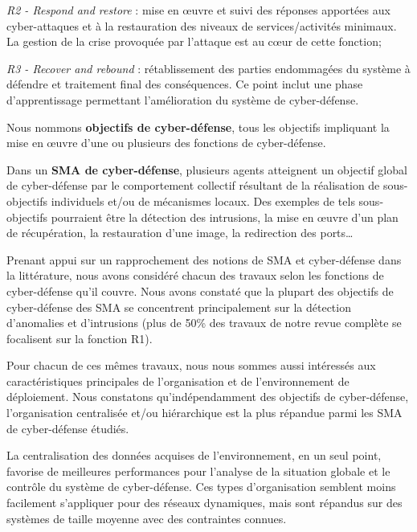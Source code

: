 \documentclass[french]{pfia}
\begin{document}
\textit{R2 - Respond and restore} : mise en œuvre et suivi des réponses apportées aux cyber-attaques et à la restauration des niveaux de services/activités minimaux. La gestion de la crise provoquée par l'attaque est au cœur de cette fonction;

\textit{R3 - Recover and rebound} : rétablissement des parties endommagées du système à défendre et traitement final des conséquences. Ce point inclut une phase d'apprentissage permettant l'amélioration du système de cyber-défense.


Nous nommons \textbf{objectifs de cyber-défense}, tous les objectifs impliquant la mise en œuvre d'une ou plusieurs des fonctions de cyber-défense.

Dans un \textbf{SMA de cyber-défense}, plusieurs agents atteignent un objectif global de cyber-défense par le comportement collectif résultant de la réalisation de sous-objectifs individuels et/ou de mécanismes locaux\cite{jamont2015meeting}. Des exemples de tels sous-objectifs pourraient être la détection des intrusions, la mise en œuvre d'un plan de récupération, la restauration d'une image, la redirection des ports\dots


Prenant appui sur un rapprochement des notions de SMA et cyber-défense dans la littérature, nous avons considéré chacun des travaux selon les fonctions de cyber-défense qu'il couvre.
Nous avons constaté que la plupart des objectifs de cyber-défense des SMA se concentrent principalement sur la détection d'anomalies et d'intrusions (plus de 50\% des travaux de notre revue complète se focalisent sur la fonction R1).

Pour chacun de ces mêmes travaux, nous nous sommes aussi intéressés aux caractéristiques principales de l’organisation et de l'environnement de déploiement.
Nous constatons qu'indépendamment des objectifs de cyber-défense, l'organisation centralisée et/ou hiérarchique est la plus répandue parmi les SMA de cyber-défense étudiés.

\noindent

La centralisation des données acquises de l'environnement, en un seul point, favorise de meilleures performances pour l'analyse de la situation globale et le contrôle du système de cyber-défense. Ces types d'organisation semblent moins facilement s'appliquer pour des réseaux dynamiques, mais sont répandus sur des systèmes de taille moyenne avec des contraintes connues\cite{vasilomanolakis2015taxonomy}.

\noindent

\end{document}

